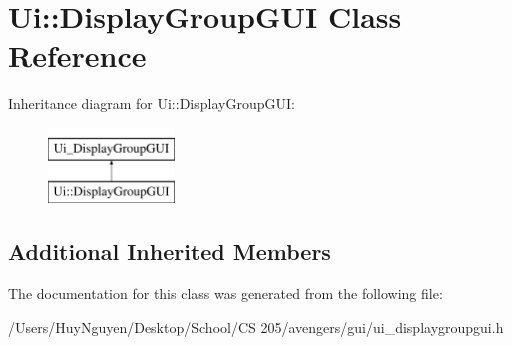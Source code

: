 \hypertarget{classUi_1_1DisplayGroupGUI}{}\section{Ui\+:\+:Display\+Group\+G\+UI Class Reference}
\label{classUi_1_1DisplayGroupGUI}
Inheritance diagram for Ui\+:\+:Display\+Group\+G\+UI\+:\begin{figure}[H]
\begin{center}
\leavevmode
\includegraphics[height=2.000000cm]{classUi_1_1DisplayGroupGUI}
\end{center}
\end{figure}
\subsection*{Additional Inherited Members}


The documentation for this class was generated from the following file\+:\begin{DoxyCompactItemize}
\item 
/\+Users/\+Huy\+Nguyen/\+Desktop/\+School/\+C\+S 205/avengers/gui/ui\+\_\+displaygroupgui.\+h\end{DoxyCompactItemize}
